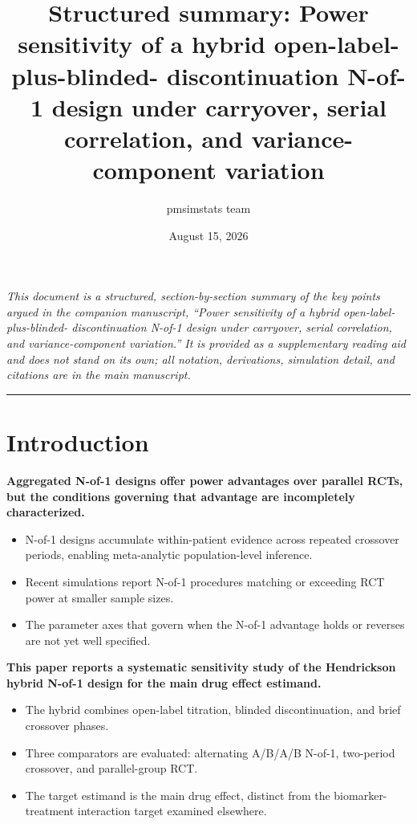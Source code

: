 \documentclass[
  11pt,
]{article}
\title{Structured summary: Power sensitivity of a hybrid open-label-plus-blinded- discontinuation N-of-1 design under carryover, serial correlation, and variance-component variation}
\author{pmsimstats team}
\date{August 15, 2026}
\begin{document}
\maketitle

{
\setcounter{tocdepth}{2}
\tableofcontents
}
\emph{This document is a structured, section-by-section summary of the key points argued in the companion manuscript, ``Power sensitivity of a hybrid open-label-plus-blinded- discontinuation N-of-1 design under carryover, serial correlation, and variance-component variation.'' It is provided as a supplementary reading aid and does not stand on its own; all notation, derivations, simulation detail, and citations are in the main manuscript.}

\bigskip\noindent

\rule{\textwidth}{0.4pt}\bigskip

\section{Introduction}\label{introduction}

\textbf{Aggregated N-of-1 designs offer power advantages over parallel RCTs, but the conditions governing that advantage are incompletely characterized.}

\begin{itemize}\setlength{\itemsep}{2pt}\setlength{\parskip}{0pt}
\item N-of-1 designs accumulate within-patient evidence across repeated crossover periods, enabling meta-analytic population-level inference.
\item Recent simulations report N-of-1 procedures matching or exceeding RCT power at smaller sample sizes.
\item The parameter axes that govern when the N-of-1 advantage holds or reverses are not yet well specified.
\end{itemize}

\textbf{This paper reports a systematic sensitivity study of the Hendrickson hybrid N-of-1 design for the main drug effect estimand.}

\begin{itemize}\setlength{\itemsep}{2pt}\setlength{\parskip}{0pt}
\item The hybrid combines open-label titration, blinded discontinuation, and brief crossover phases.
\item Three comparators are evaluated: alternating A/B/A/B N-of-1, two-period crossover, and parallel-group RCT.
\item The target estimand is the main drug effect, distinct from the biomarker-treatment interaction target examined elsewhere.
\end{itemize}
\end{document}
